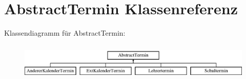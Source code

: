 \hypertarget{class_abstract_termin}{}\section{Abstract\+Termin Klassenreferenz}
\label{class_abstract_termin}
Klassendiagramm für Abstract\+Termin\+:\begin{figure}[H]
\begin{center}
\leavevmode
\includegraphics[height=1.794872cm]{class_abstract_termin}
\end{center}
\end{figure}
